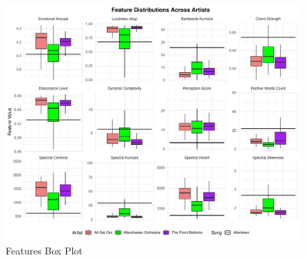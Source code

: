 \documentclass{article}\usepackage[]{graphicx}\usepackage[]{xcolor}
\begin{document}
\begin{figure}[H]
  \begin{center}
  \includegraphics[width=\textwidth]{feature.plot.pdf}
  \caption{Features Box Plot}
  \label{plot1}
  \end{center}
\end{figure}
\end{document}
